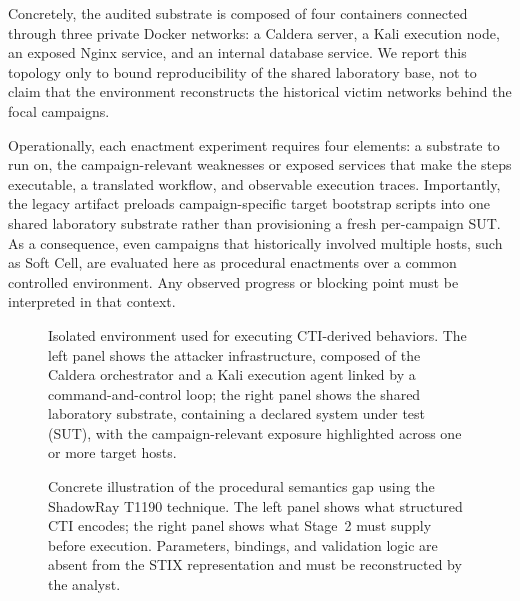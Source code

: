 \documentclass[sigconf]{acmart}
\newcommand{\stix}{STIX\xspace}
\newcommand{\caldera}{Caldera\xspace}
\begin{document}
Concretely, the audited substrate is composed of four containers connected through three private Docker networks: a \caldera{} server, a Kali execution node, an exposed Nginx service, and an internal database service. We report this topology only to bound reproducibility of the shared laboratory base, not to claim that the environment reconstructs the historical victim networks behind the focal campaigns.

Operationally, each enactment experiment requires four elements: a substrate to run on, the campaign-relevant weaknesses or exposed services that make the steps executable, a translated workflow, and observable execution traces. Importantly, the legacy artifact preloads campaign-specific target bootstrap scripts into one shared laboratory substrate rather than provisioning a fresh per-campaign SUT. As a consequence, even campaigns that historically involved multiple hosts, such as Soft Cell, are evaluated here as procedural enactments over a common controlled environment. Any observed progress or blocking point must be interpreted in that context.

\begin{figure}[t]
    \centering
\resizebox{\columnwidth}{!}{}
    \caption{Isolated environment used for executing CTI-derived behaviors. The left panel shows the attacker infrastructure, composed of the \caldera{} orchestrator and a Kali execution agent linked by a command-and-control loop; the right panel shows the shared laboratory substrate, containing a declared system under test (SUT), with the campaign-relevant exposure highlighted across one or more target hosts.}
    \label{fig:env}
\end{figure}

\begin{figure}[htpb]
    \centering
    \resizebox{\textwidth}{!}{}
    \caption{Concrete illustration of the procedural semantics gap using the ShadowRay T1190 technique. The left panel shows what structured CTI encodes; the right panel shows what Stage~2 must supply before execution. Parameters, bindings, and validation logic are absent from the \stix{} representation and must be reconstructed by the analyst.}
    \label{fig:gap-example}
\end{figure}
\end{document}
